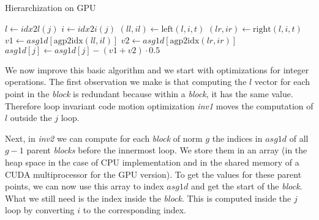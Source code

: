 \begin{algorithm}[b]
\small{
	\caption{Hierarchization on GPU}
 	\label{alg:hierarchization}                       

 	\begin{algorithmic}[1]
 				\State {}
 			\EndFor
 		\EndFor
	\end{algorithmic}
 
	\begin{algorithmic}[1]
	 				\State $l \leftarrow idx2l(j)$
	 			\EndIf
	 			\State $i \leftarrow idx2i(j)$
	 			\State $(\textit{ll}, \textit{il}) \leftarrow \text{left}(l, i, t)$
	 			\State $(\textit{lr}, \textit{ir}) \leftarrow \text{right}(l, i, t)$
	 			\State $\textit{v1} \leftarrow \textit{asg1d}[\text{agp2idx}(\textit{ll},
	 			\textit{il})]$ \State $\textit{v2} \leftarrow
	 			\textit{asg1d}[\text{agp2idx}(\textit{lr}, \textit{ir})]$ \State$\textit{asg1d}[j] \leftarrow \textit{asg1d}[j] - (\textit{v1} +\textit{v2}) \cdot 0.5$
			\EndFor
		\EndProcedure
	\end{algorithmic}
}
\end{algorithm}

We now improve this basic algorithm and we start with optimizations for integer
operations. The first observation we make is that computing the $l$ vector for
each point in the \textit{block} is redundant because within a \textit{block},
it has the same value. Therefore loop invariant code motion optimization
\textit{inv1} moves the computation of $l$ outside the $j$ loop. 

Next, in \textit{inv2} we can compute for each \textit{block} of norm $g$ the
indices in $asg1d$ of all $g-1$ parent \textit{blocks} before the innermost
loop. We store them in an array (in the heap space in the case of CPU
implementation and in the shared memory of a CUDA multiprocessor for the GPU
version). To get the values for these parent points, we can now use this array
to index $asg1d$ and get the start of the \textit{block}. What we still need is
the index inside the \textit{block}. This is computed inside the $j$ loop by
converting $i$ to the corresponding index.

